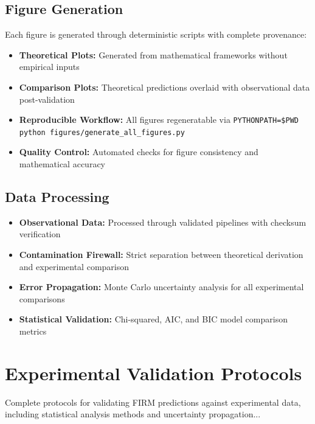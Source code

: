 \documentclass[12pt]{article}
\begin{document}
\subsection{Figure Generation}

Each figure is generated through deterministic scripts with complete provenance:
\begin{itemize}
    \item \textbf{Theoretical Plots:} Generated from mathematical frameworks without empirical inputs
    \item \textbf{Comparison Plots:} Theoretical predictions overlaid with observational data post-validation
    \item \textbf{Reproducible Workflow:} All figures regeneratable via \texttt{PYTHONPATH=\$PWD python figures/generate\_all\_figures.py}
    \item \textbf{Quality Control:} Automated checks for figure consistency and mathematical accuracy
\end{itemize}

\subsection{Data Processing}

\begin{itemize}
    \item \textbf{Observational Data:} Processed through validated pipelines with checksum verification
    \item \textbf{Contamination Firewall:} Strict separation between theoretical derivation and experimental comparison
    \item \textbf{Error Propagation:} Monte Carlo uncertainty analysis for all experimental comparisons
    \item \textbf{Statistical Validation:} Chi-squared, AIC, and BIC model comparison metrics
\end{itemize}

\section{Experimental Validation Protocols}

Complete protocols for validating FIRM predictions against experimental data, including statistical analysis methods and uncertainty propagation...


\end{document}
